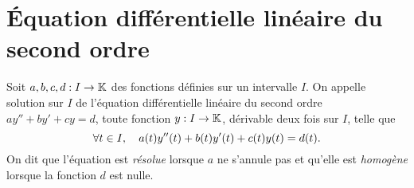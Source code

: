 \documentclass{magnolia}
\begin{document}


\section{Équation différentielle linéaire du second ordre}

\begin{definition}
Soit $a,b,c,d:I\to\mathbb{K}$ des fonctions définies sur un intervalle $I$. On appelle solution sur $I$ de l'équation différentielle linéaire du second ordre $ay''+by'+cy=d$, toute fonction $y:I\to\mathbb{K}$, dérivable deux fois sur $I$, telle que
\[\forall t\in I ,\quad a(t)y''(t)+b(t)y'(t)+c(t)y(t)=d(t).\]
On dit que l'équation est \emph{résolue} lorsque $a$ ne s'annule pas et qu'elle est \emph{homogène} lorsque la fonction $d$ est nulle.
\end{definition}
\end{document}
